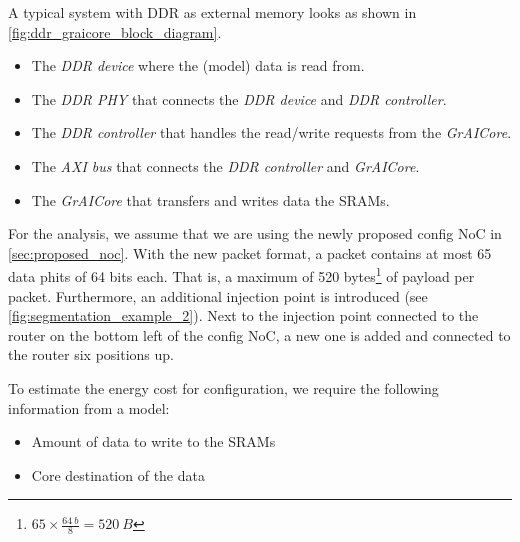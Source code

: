A typical system with DDR as external memory looks as shown in \cref{fig:ddr_graicore_block_diagram}.
\begin{itemize}
    \item The \textit{DDR device} where the (model) data is read from.
    \item The \textit{DDR PHY} that connects the \textit{DDR device} and \textit{DDR controller}.
    \item The \textit{DDR controller} that handles the read/write requests from the \textit{GrAICore}.
    \item The \textit{AXI bus} that connects the \textit{DDR controller} and \textit{GrAICore}.
    \item The \textit{GrAICore} that transfers and writes data the SRAMs.
\end{itemize}



For the analysis, we assume that we are using the newly proposed config NoC in \cref{sec:proposed_noc}. 
With the new packet format, a packet contains at most 65 data phits of 64 bits each.
That is, a maximum of 520 bytes\footnote{$65 \times \frac{\SI{64}{b}}{8} = \SI{520}{B}$} of payload per packet.
Furthermore, an additional injection point is introduced (see \cref{fig:segmentation_example_2}).
Next to the injection point connected to the router on the bottom left of the config NoC, a new one is added and connected to the router six positions up.

To estimate the energy cost for configuration, we require the following information from a model:
\begin{itemize}
    \item Amount of data to write to the SRAMs
    \item Core destination of the data
\end{itemize}

